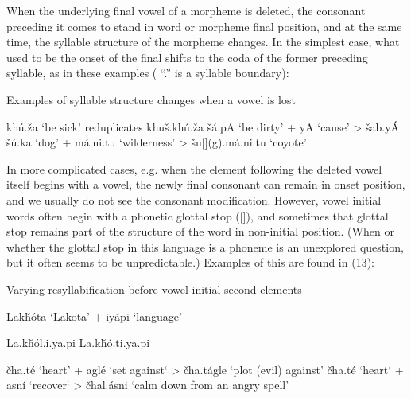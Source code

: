\documentclass[output=paper]{LSP/langsci}
\begin{document}
When the underlying final vowel of a morpheme is deleted, the consonant preceding it comes to stand in word or morpheme final position, and at the same time, the syllable structure of the morpheme changes. In the simplest case, what used to be the onset of the final shifts to the coda of the former preceding syllable, as in these examples ( ``.'' is a syllable boundary):

\begin{exe}
\ex Examples of syllable structure changes when a vowel is lost
\begin{xlist}
\ex kh\'u.\v{z}a `be sick' reduplicates khu\v{s}.kh\'u.\v{z}a
\ex \v{s}\'a.pA `be dirty' + yA `cause' > \v{s}ab.y\'A
\ex \v{s}\'u.ka `dog' + m\'a.ni.tu `wilderness' > \v{s}u[](g).m\'a.ni.tu `coyote'
\end{xlist}
\end{exe}

In more complicated cases, e.g. when the element following the deleted vowel itself begins with a vowel, the newly final consonant can remain in onset position, and we usually do not see the consonant modification. However, vowel initial words often begin with a phonetic glottal stop ([]), and sometimes that glottal stop remains part of the structure of the word in non-initial position. (When or whether the glottal stop in this language is a phoneme is an unexplored question, but it often seems to be unpredictable.) Examples of this are found in (13):

\begin{exe}
\ex Varying resyllabification before vowel-initial second elements
\begin{xlist}
\ex Lak\v{h}\'ota `Lakota' + iy\'api `language'
\begin{xlist}
\ex La.k\v{h}\'ol.i.ya.pi
\ex La.k\v{h}\'o.ti.ya.pi
\end{xlist}
\ex 
\begin{xlist}
\ex \v{c}ha.t\'e `heart' + agl\'e `set against` > \v{c}ha.t\'agle `plot (evil) against'
\ex \v{c}ha.t\'e `heart` + asn\'i `recover` > \v{c}hal.\'asni `calm down from an angry spell'
\end{xlist}
\end{xlist}
\end{exe}
\end{document}
